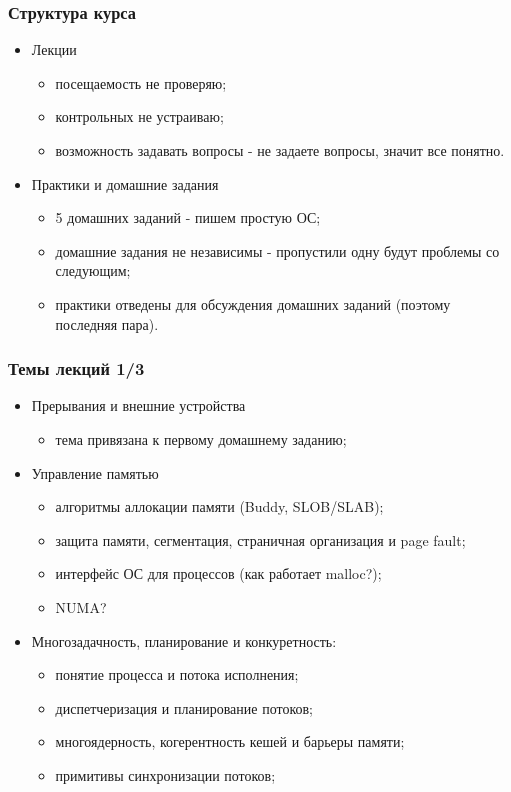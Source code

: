 \begin{frame}
\frametitle{Структура курса}
\begin{itemize}
  \item Лекции
  \begin{itemize}
    \item посещаемость не проверяю;
    \item контрольных не устраиваю;
    \item возможность задавать вопросы - не задаете вопросы, значит все понятно.
  \end{itemize}
  \item Практики и домашние задания
  \begin{itemize}
    \item 5 домашних заданий - пишем простую ОС;
    \item домашние задания не независимы - пропустили одну будут проблемы со
    следующим;
    \item практики отведены для обсуждения домашних заданий (поэтому последняя
    пара).
  \end{itemize}
\end{itemize}
\end{frame}

\begin{frame}
\frametitle{Темы лекций 1/3}
\begin{itemize}
  \item Прерывания и внешние устройства
  \begin{itemize}
    \item тема привязана к первому домашнему заданию;
  \end{itemize}
  \item Управление памятью
  \begin{itemize}
    \item алгоритмы аллокации памяти (Buddy, SLOB/SLAB);
    \item защита памяти, сегментация, страничная организация и page fault;
    \item интерфейс ОС для процессов (как работает malloc?);
    \item NUMA?
  \end{itemize}
  \item Многозадачность, планирование и конкуретность:
  \begin{itemize}
    \item понятие процесса и потока исполнения;
    \item диспетчеризация и планирование потоков;
    \item многоядерность, когерентность кешей и барьеры памяти;
    \item примитивы синхронизации потоков;
  \end{itemize}
\end{itemize}
\end{frame}

